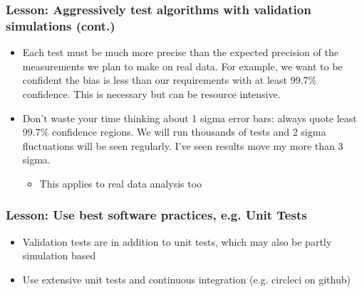 \documentclass{beamer}
\begin{document}
\frame
{
    \frametitle{Lesson: Aggressively test algorithms with validation simulations (cont.)}


    \begin{itemize}


        \item Each test must be much more precise than the expected precision
            of the measurements we plan to make on real data.  For example, we
            want to be confident the bias is less than our requirements with at
            least 99.7\% confidence.  This is necessary but can be resource
            intensive.

        \item Don't waste your time thinking about 1 sigma error bars:  always
            quote least 99.7\% confidence regions.  We will run thousands of
            tests and 2 sigma fluctuations will be seen regularly. I've
            seen results move my more than 3 sigma.

            \begin{itemize}
                \item This applies to real data analysis too
            \end{itemize}

    \end{itemize}

}



\frame
{
    \frametitle{Lesson: Use best software practices, e.g. Unit Tests}

    \begin{itemize}

        \item Validation tests are in addition to unit tests, which may also be
            partly simulation based

        \item Use extensive unit tests and continuous integration (e.g. circleci
            on github)

    \end{itemize}

}
\end{document}

